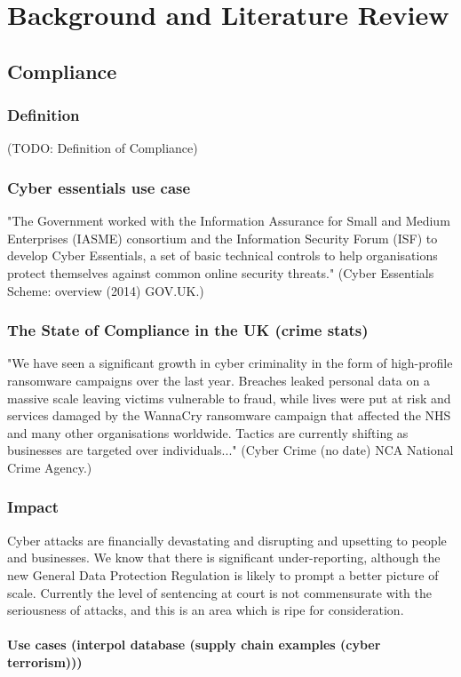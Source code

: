 \chapter{Background and Literature Review} \label{Chapter:two}

\section{Compliance}
    \subsection{Definition}
        (TODO: Definition of Compliance)

    \subsection{Cyber essentials use case}
        "The Government worked with the Information Assurance for Small and Medium Enterprises (IASME) consortium and the Information Security Forum (ISF) to develop Cyber Essentials, a set of basic technical controls to help organisations protect themselves against common online security threats." (Cyber Essentials Scheme: overview (2014) GOV.UK.)

    \subsection{The State of Compliance in the UK (crime stats)}
    "We have seen a significant growth in cyber criminality in the form of high-profile ransomware campaigns over the last year. Breaches leaked personal data on a massive scale leaving victims vulnerable to fraud, while lives were put at risk and services damaged by the WannaCry ransomware campaign that affected the NHS and many other organisations worldwide. Tactics are currently shifting as businesses are targeted over individuals..." (Cyber Crime (no date) NCA National Crime Agency.)

    \subsection{Impact}
        Cyber attacks are financially devastating and disrupting and upsetting to people and businesses. We know that there is significant under-reporting, although the new General Data Protection Regulation is likely to prompt a better picture of scale. Currently the level of sentencing at court is not commensurate with the seriousness of attacks, and this is an area which is ripe for consideration.

        \subsubsection{Use cases (interpol database (supply chain examples (cyber terrorism)))}
